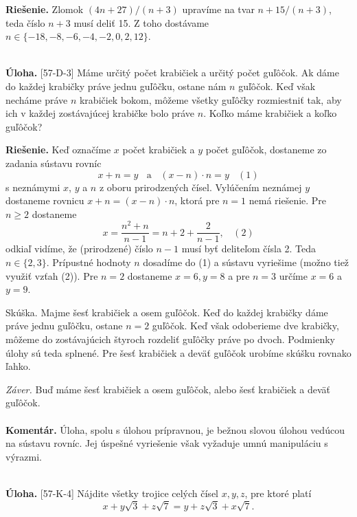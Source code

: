 \documentclass[11pt,a4paper,oneside,final]{book}
\newcommand{\kom}{\textbf{Komentár.} }
\newcommand{\ul}{\textbf{Úloha.} }
\newcommand{\rie}{\textbf{Riešenie.} }
\begin{document}
\rie Zlomok $(4n+27)/(n+3)$ upravíme na tvar $n+15/(n+3)$, teda číslo $n+3$ musí deliť 15. Z toho dostávame $n \in \{-18,-8,-6,-4,-2, 0, 2,12 \}$.\\
\\
\begin{tcolorbox}[breakable,notitle,boxrule=0pt,colback=light-gray,colframe=light-gray]\ul [57-D-3]
Máme určitý počet krabičiek a určitý počet guľôčok. Ak dáme do každej krabičky práve jednu guľôčku, ostane nám $n$ guľôčok. Keď však necháme práve $n$ krabičiek bokom, môžeme všetky guľôčky rozmiestniť tak, aby ich v každej zostávajúcej krabičke bolo práve $n$. Koľko máme krabičiek a koľko guľôčok?

\end{tcolorbox}

\rie  Keď označíme $x$ počet krabičiek a $y$ počet guľôčok, dostaneme zo zadania sústavu rovníc
$$x + n = y \ \ \ \ \textrm{a} \ \ \ \ (x - n) \cdot n = y\ \ \ \ (1) $$
s neznámymi $x$, $y$ a $n$ z oboru prirodzených čísel. Vylúčením neznámej $y$ dostaneme rovnicu $x + n = (x - n) \cdot n$, ktorá pre $n = 1$ nemá riešenie. Pre $n \geq 2$ dostaneme
$$ x =\frac{n^2+n}{n-1}=n+2+\frac{2}{n-1}, \ \ \ \ (2)$$
odkiaľ vidíme, že (prirodzené) číslo $n - 1$ musí byť deliteľom čísla 2. Teda $n \in \{2, 3\}$.
Prípustné hodnoty $n$ dosadíme do (1) a sústavu vyriešime (možno tiež využiť vzťah (2)). Pre $n = 2$ dostaneme $x = 6, y = 8$ a pre $n = 3$ určíme $x = 6$ a $y = 9$.

Skúška. Majme šesť krabičiek a osem guľôčok. Keď do každej krabičky dáme práve jednu guľôčku, ostane $n = 2$ guľôčok. Keď však odoberieme dve krabičky, môžeme do zostávajúcich štyroch rozdeliť guľôčky práve po dvoch. Podmienky úlohy sú teda splnené. Pre šesť krabičiek a deväť guľôčok urobíme skúšku rovnako ľahko.

\textit{Záver.} Buď máme šesť krabičiek a osem guľôčok, alebo šesť krabičiek a deväť guľôčok.\\
\\
\kom Úloha, spolu s úlohou prípravnou, je bežnou slovou úlohou vedúcou na sústavu rovníc. Jej úspešné vyriešenie však vyžaduje umnú manipuláciu s výrazmi.\\
\\
\begin{tcolorbox}[breakable,notitle,boxrule=0pt,colback=light-gray,colframe=light-gray]\ul [57-K-4]
Nájdite všetky trojice celých čísel $x, y, z$, pre ktoré platí
$$x+y\sqrt{3}+z\sqrt{7}=y+z\sqrt{3}+x\sqrt{7}. $$
\end{tcolorbox}
\end{document}
